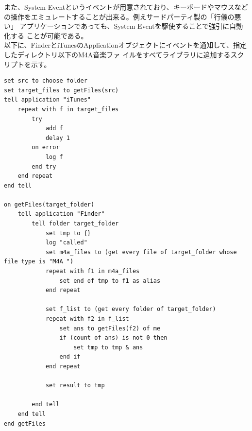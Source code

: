 \documentclass[a4paper,7pt]{jsarticle}
\begin{document}
また、System Eventというイベントが用意されており、キーボードやマウスなど
の操作をエミュレートすることが出来る。例えサードパーティ製の「行儀の悪い」
アプリケーションであっても、System Eventを駆使することで強引に自動化する
ことが可能である。\\

以下に、FinderとiTunesのApplicationオブジェクトにイベントを通知して、指定したディレクトリ以下のM4A音楽ファ
イルをすべてライブラリに追加するスクリプトを示す。

\begin{lstlisting}
set src to choose folder
set target_files to getFiles(src)
tell application "iTunes"
	repeat with f in target_files
		try
			add f
			delay 1
		on error
			log f
		end try
	end repeat
end tell

on getFiles(target_folder)
	tell application "Finder"
		tell folder target_folder
			set tmp to {}
			log "called"
			set m4a_files to (get every file of target_folder whose file type is "M4A ")
			repeat with f1 in m4a_files
				set end of tmp to f1 as alias
			end repeat
			
			set f_list to (get every folder of target_folder)
			repeat with f2 in f_list
				set ans to getFiles(f2) of me
				if (count of ans) is not 0 then
					set tmp to tmp & ans
				end if
			end repeat
			
			set result to tmp
			
		end tell
	end tell
end getFiles
\end{lstlisting}
\end{document}
